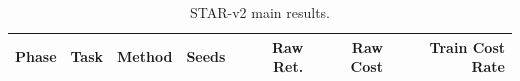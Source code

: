 \begin{table}[t]
\centering
\caption{STAR-v2 main results.}
\label{tab:star-v2-main}
\begin{tabular}{lllrrrr}
\toprule
Phase & Task & Method & Seeds & Raw Ret. & Raw Cost & Train Cost Rate \\
\midrule
\bottomrule
\end{tabular}
\end{table}
